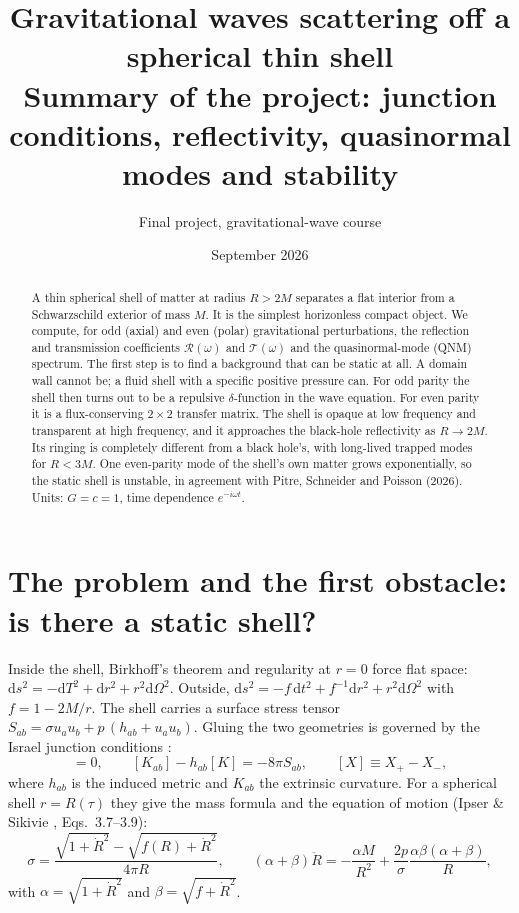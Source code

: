 \documentclass[10pt,a4paper]{article}
\title{\vspace{-8mm}\textbf{Gravitational waves scattering off a spherical thin shell}\\[2pt]
\large Summary of the project: junction conditions, reflectivity, quasinormal modes and stability}
\author{Final project, gravitational-wave course}
\date{September 2026}
\newcommand{\dd}{\mathrm{d}}
\newcommand{\RR}{\mathcal R}
\newcommand{\TT}{\mathcal T}
\begin{document}
\maketitle
\vspace{-6mm}

\begin{abstract}\noindent
A thin spherical shell of matter at radius $R>2M$ separates a flat interior from a Schwarzschild exterior of mass $M$.
It is the simplest horizonless compact object. We compute, for odd (axial) and even (polar) gravitational
perturbations, the reflection and transmission coefficients $\RR(\omega)$ and $\TT(\omega)$ and the quasinormal-mode (QNM)
spectrum. The first step is to find a background that can be static at all. A domain wall cannot be; a fluid shell
with a specific positive pressure can. For odd parity the shell then turns out to be a repulsive $\delta$-function in
the wave equation. For even parity it is a flux-conserving $2\times2$ transfer matrix. The shell is opaque at low
frequency and transparent at high frequency, and it approaches the black-hole reflectivity as $R\to2M$. Its ringing is
completely different from a black hole's, with long-lived trapped modes for $R<3M$. One even-parity mode of the
shell's own matter grows exponentially, so the static shell is unstable, in agreement with Pitre, Schneider and Poisson
(2026). Units: $G=c=1$, time dependence $e^{-i\omega t}$.
\end{abstract}

\section{The problem and the first obstacle: is there a static shell?}
Inside the shell, Birkhoff's theorem and regularity at $r=0$ force flat space: $\dd s^2=-\dd T^2+\dd r^2+r^2\dd\Omega^2$.
Outside, $\dd s^2=-f\,\dd t^2+f^{-1}\dd r^2+r^2\dd\Omega^2$ with $f=1-2M/r$. The shell carries a surface stress tensor
$S_{ab}=\sigma u_au_b+p\,(h_{ab}+u_au_b)$. Gluing the two geometries is governed by the Israel junction conditions
\cite{Israel66,Poisson04}:
\begin{equation}
[h_{ab}]=0,\qquad [K_{ab}]-h_{ab}[K]=-8\pi S_{ab},\qquad [X]\equiv X_+-X_- ,
\label{eq:israel}
\end{equation}
where $h_{ab}$ is the induced metric and $K_{ab}$ the extrinsic curvature. For a spherical shell $r=R(\tau)$ they give
the mass formula and the equation of motion (Ipser \& Sikivie \cite{IS84}, Eqs.~3.7--3.9):
\begin{equation}
\sigma=\frac{\sqrt{1+\dot R^2}-\sqrt{f(R)+\dot R^2}}{4\pi R},\qquad
(\alpha+\beta)\ddot R=-\frac{\alpha M}{R^2}+\frac{2p}{\sigma}\frac{\alpha\beta(\alpha+\beta)}{R},
\end{equation}
with $\alpha=\sqrt{1+\dot R^2}$ and $\beta=\sqrt{f+\dot R^2}$.
\end{document}
